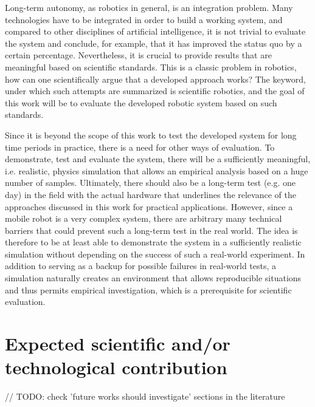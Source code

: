\documentclass[german, master, expose, latin1]{base/thesis_KBS}
\begin{document}
Long-term autonomy, as robotics in general, is an integration problem. Many technologies have to be integrated in order to build a working system, and compared to
other disciplines of artificial intelligence, it is not trivial to evaluate the system and conclude, for example, that it has improved the status quo by a certain percentage.
Nevertheless, it is crucial to provide results that are meaningful based on scientific standards. This is a classic problem in robotics, 
how can one scientifically argue that a developed approach works? The keyword, under which such attempts are summarized is scientific robotics, 
and the goal of this work will be to evaluate the developed robotic system based on such standards.\newline

Since it is beyond the scope of this work to test the developed system for long time periods in practice, there is a need for other ways of evaluation.
To demonstrate, test and evaluate the system, there will be a sufficiently meaningful, i.e. realistic, physics simulation that allows an empirical analysis based 
on a huge number of samples. Ultimately, there should also be a long-term test (e.g. one day) in the field with the actual hardware that underlines the relevance of 
the approaches discussed in this work for practical applications. However, since a mobile robot is a very complex system, there are arbitrary many technical barriers 
that could prevent such a long-term test in the real world. The idea is therefore to be at least able to demonstrate the system in a sufficiently realistic simulation 
without depending on the success of such a real-world experiment. In addition to serving as a backup for possible failures in real-world tests, a simulation naturally 
creates an environment that allows reproducible situations and thus permits empirical investigation, which is a prerequisite for scientific evaluation.

\pagebreak

\section{Expected scientific and/or technological contribution}

// TODO: check 'future works should investigate' sections in the literature\newline
\end{document}

